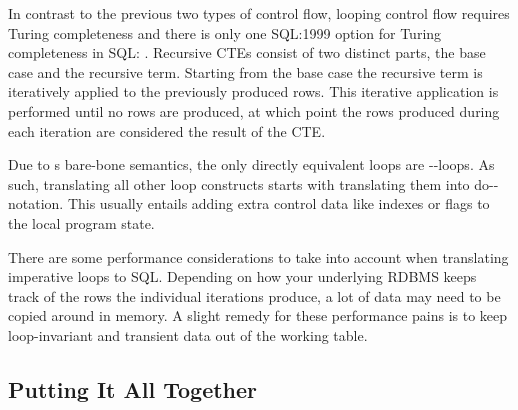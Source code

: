 \documentclass[sigconf,nonacm,screen,review,balance=false]{acmart}
\begin{document}
In contrast to the previous two types of control flow, looping control flow
requires Turing completeness and there is only one SQL:1999 option for Turing
completeness in SQL: . Recursive CTEs consist of two
distinct parts, the base case and the recursive term. Starting from the base
case the recursive term is iteratively applied to the previously produced rows.
This iterative application is performed until no rows are produced, at which
point the rows produced during each iteration are considered the result of the
CTE.

Due to s bare-bone semantics, the only directly
equivalent loops are --loops. As such, translating
all other loop constructs starts with translating them into \keyword
{do}--notation. This usually entails adding extra control data
like indexes or flags to the local program state.

There are some performance considerations to take into account when translating
imperative loops to SQL. Depending on how your underlying RDBMS keeps track of
the rows the individual iterations produce, a lot of data may need to be copied
around in memory. A slight remedy for these performance pains is to keep
loop-invariant and transient data out of the working table.

\subsection{Putting It All Together}
\end{document}

